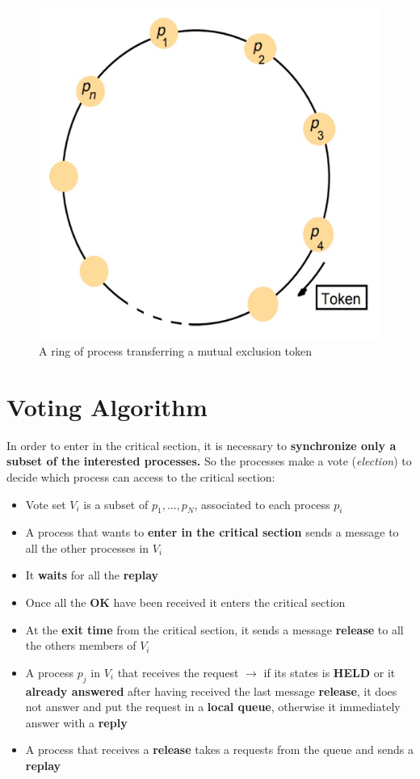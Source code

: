 \begin{figure}[!h]
    \centering
    \includegraphics[width=.5\linewidth]{images/SynchronizationCoordinationDS/ringMutialExclusionToken.jpeg}
    \caption{A ring of process transferring a mutual exclusion token}
\end{figure}

\newpage
\section{Voting Algorithm}
In order to enter in the critical section, it is necessary to \textbf{synchronize only a subset of the interested processes.} So the processes make a vote (\textit{election}) to decide which process can access to the critical section:
\begin{itemize}
    \item Vote set \(V_i\) is a subset of \({p_1,...,p_N}\), associated to each process \(p_i\)
    \item A process that wants to \textbf{enter in the critical section} sends a message to all the other processes in \(V_i\)
    \item It \textbf{waits} for all the \textbf{replay}
    \item Once all the \textbf{OK} have been received it enters the critical section
    \item At the \textbf{exit time} from the critical section, it sends a message \textbf{release} to all the others members of \(V_i\)
    \item A process \(p_j\) in \(V_i\) that receives the request \(\rightarrow\) if its states is \textbf{HELD} or it \textbf{already answered} after having received the last message \textbf{release}, it does not answer and put the request in a \textbf{local queue}, otherwise it immediately answer with a \textbf{reply}
    \item A process that receives a \textbf{release} takes a requests from the queue and sends a \textbf{replay}
\end{itemize}

